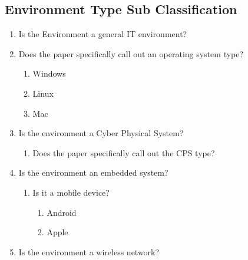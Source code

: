 \subsection{Environment Type Sub Classification}
\begin{enumerate}
    \item Is the Environment a general IT environment?
    \item Does the paper specifically call out an operating system type?
    \begin{enumerate}
        \item Windows
        \item Linux
        \item Mac
    \end{enumerate}
    \item Is the environment a Cyber Physical System?
        \begin{enumerate}
            \item Does the paper specifically call out the CPS type?
        \end{enumerate}
    \item Is the environment an embedded system?
        \begin{enumerate}
            \item Is it a mobile device?
            \begin{enumerate}
                    \item Android
                    \item Apple
            \end{enumerate}
        \end{enumerate}
    \item Is the environment a wireless network?
\end{enumerate}